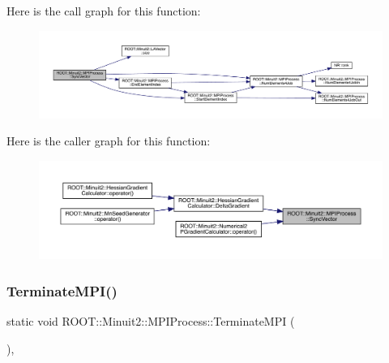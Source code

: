 Here is the call graph for this function\+:\nopagebreak
\begin{figure}[H]
\begin{center}
\leavevmode
\includegraphics[width=350pt]{dc/d43/classROOT_1_1Minuit2_1_1MPIProcess_a179f3ea817399a73cbce05d1778ec128_cgraph}
\end{center}
\end{figure}
Here is the caller graph for this function\+:\nopagebreak
\begin{figure}[H]
\begin{center}
\leavevmode
\includegraphics[width=350pt]{dc/d43/classROOT_1_1Minuit2_1_1MPIProcess_a179f3ea817399a73cbce05d1778ec128_icgraph}
\end{center}
\end{figure}
\mbox{\label{classROOT_1_1Minuit2_1_1MPIProcess_aa870a057a256be2d95fb7e9d03a9c298}} 
\subsubsection{\texorpdfstring{TerminateMPI()}{TerminateMPI()}\hspace{0.1cm}{\footnotesize\ttfamily [1/2]}}
{\footnotesize\ttfamily static void R\+O\+O\+T\+::\+Minuit2\+::\+M\+P\+I\+Process\+::\+Terminate\+M\+PI (\begin{DoxyParamCaption}{ }\end{DoxyParamCaption})\hspace{0.3cm}{\ttfamily [inline]}, {\ttfamily [static]}}

\mbox{\label{classROOT_1_1Minuit2_1_1MPIProcess_aa870a057a256be2d95fb7e9d03a9c298}} 

